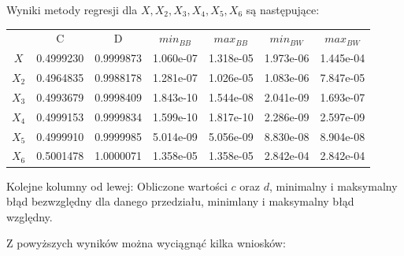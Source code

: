 \documentclass[11pt,wide]{mwart}
\begin{document}
\begin{samepage}
Wyniki metody regresji dla $X, X_2, X_3, X_4, X_5, X_6$ są następujące:

\begin{center}
\begin{tabular}{||c c c c c c c||} 
 \hline
	    & C         & D         & $min_{BB}$        & $max_{BB}$       & $min_{BW}$        & $max_{BW}$        \\ [0.5ex] 
 $X$    & 0.4999230 & 0.9999873 & 1.060e-07 & 1.318e-05 & 1.973e-06 & 1.445e-04 \\ 
 $X_2$  & 0.4964835 & 0.9988178 & 1.281e-07 & 1.026e-05 & 1.083e-06 & 7.847e-05 \\
 $X_3$  & 0.4993679 & 0.9998409 & 1.843e-10 & 1.544e-08 & 2.041e-09 & 1.693e-07 \\
 $X_4$  & 0.4999153 & 0.9999834 & 1.599e-10 & 1.817e-10 & 2.286e-09 & 2.597e-09 \\
 $X_5$  & 0.4999910 & 0.9999985 & 5.014e-09 & 5.056e-09 & 8.830e-08 & 8.904e-08 \\ 
 $X_6$  & 0.5001478 & 1.0000071 & 1.358e-05 & 1.358e-05 & 2.842e-04 & 2.842e-04 \\ [1ex]
 \hline
\end{tabular}
\newline
\small{Kolejne kolumny od lewej: Obliczone wartości $c$ oraz $d$, minimalny i maksymalny błąd bezwzględny dla danego przedziału, minimlany i maksymalny błąd względny.}

\end{center}

\end{samepage}
Z powyższych wyników można wyciągnąć kilka wniosków:
\end{document}
